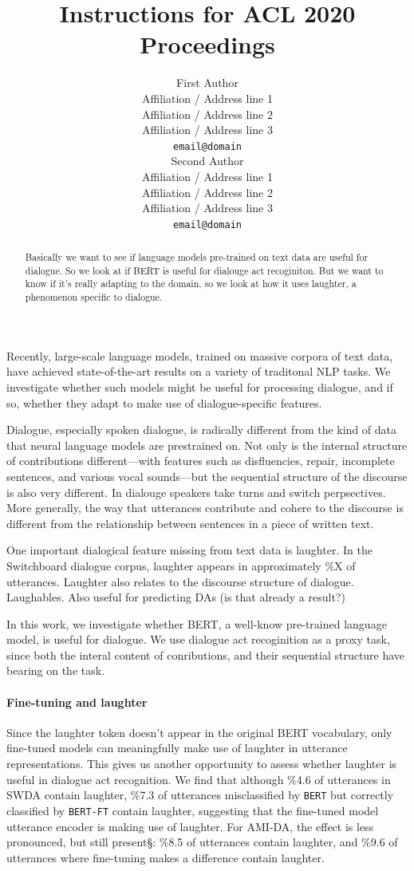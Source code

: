 \documentclass[11pt,a4paper]{article}
\title{Instructions for ACL 2020 Proceedings}
\author{First Author \\
  Affiliation / Address line 1 \\
  Affiliation / Address line 2 \\
  Affiliation / Address line 3 \\
  \texttt{email@domain} \\\And
  Second Author \\
  Affiliation / Address line 1 \\
  Affiliation / Address line 2 \\
  Affiliation / Address line 3 \\
  \texttt{email@domain} \\}
\date{}
\begin{document}
\maketitle
\begin{abstract}
  Basically we want to see if language models pre-trained on text data are useful for dialogue.
  So we look at if BERT is useful for dialouge act recoginiton.
  But we want to know if it's really adapting to the domain, so we look at how it uses laughter, a phenomenon specific to dialogue.
\end{abstract}


Recently, large-scale language models, trained on massive corpora of text data, have achieved state-of-the-art results on a variety of traditonal NLP tasks.
We investigate whether such models might be useful for processing dialogue, and if so, whether they adapt to make use of dialogue-specific features.

Dialogue, especially spoken dialogue, is radically different from the kind of data that neural language models are prestrained on.
Not only is the internal structure of contributions different---with features such as disfluencies, repair, incomplete sentences, and various vocal sounds---but the sequential structure of the discourse is also very different.
In dialouge speakers take turns and switch perpsectives.
More generally, the way that utterances contribute and cohere to the discourse is different from the relationship between sentences in a piece of written text.

One important dialogical feature missing from text data is laughter.
In the Switchboard dialogue corpus, laughter appears in approximately \%X of utterances.
Laughter also relates to the discourse structure of dialogue. 
Laughables.
Also useful for predicting DAs (is that already a result?)

In this work, we investigate whether BERT, a well-know pre-trained language model, is useful for dialogue.
We use dialogue act recoginition as a proxy task, since both the interal content of conributions, and their sequential structure have bearing on the task.

\paragraph{Fine-tuning and laughter}
Since the laughter token doesn't appear in the original BERT vocabulary, only fine-tuned models can meaningfully make use of laughter in utterance representations. 
This gives us another opportunity to assess whether laughter is useful in dialogue act recognition.
We find that although \%4.6 of utterances in SWDA contain laughter, \%7.3 of utterances misclassified by \texttt{BERT} but correctly classified by \texttt{BERT-FT} contain laughter, suggesting that the fine-tuned model utterance encoder is making use of laughter. 
For AMI-DA, the effect is less pronounced, but still present§: \%8.5 of utterances contain laughter, and \%9.6 of utterances where fine-tuning makes a difference contain laughter.
\end{document}
